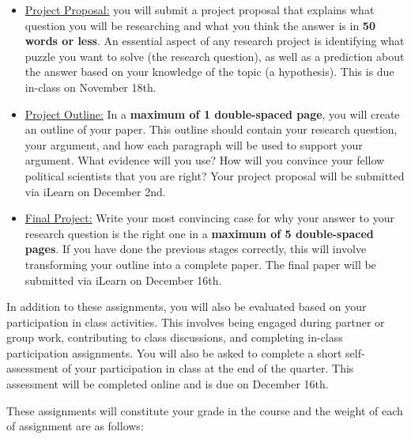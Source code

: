 \documentclass[11pt]{article}
\begin{document}
\begin{enumerate}
		\begin{itemize}
			\item \underline{Project Proposal:} you will submit a project proposal that explains what question you will be researching and what you think the answer is in \textbf{50 words or less}. An essential aspect of any research project is identifying what puzzle you want to solve (the research question), as well as a prediction about the answer based on your knowledge of the topic (a hypothesis). {\color{red} This is due in-class on November 18th.}
			\item \underline{Project Outline:} In a \textbf{maximum of 1 double-spaced page}, you will create an outline of your paper. This outline should contain your research question, your argument, and how each paragraph will be used to support your argument. What evidence will you use? How will you convince your fellow political scientists that you are right?  {\color{red} Your project proposal will be submitted via iLearn on December 2nd.}
			\item \underline{Final Project:} Write your most convincing case for why your answer to your research question is the right one in a \textbf{maximum of 5 double-spaced pages}. If you have done the previous stages correctly, this will involve transforming your outline into a complete paper. {\color{red} The final paper will be submitted via iLearn on December 16th.}  
		\end{itemize} 
\end{enumerate}

In addition to these assignments, you will also be evaluated based on your participation in class activities. This involves being engaged during partner or group work, contributing to class discussions, and completing in-class participation assignments. You will also be asked to complete a short self-assessment of your participation in class at the end of the quarter. {\color{red} This assessment will be completed online and is due on December 16th.}  

These assignments will constitute your grade in the course and the weight of each of assignment are as follows:

\begin{center}
\end{center}
\end{document}
